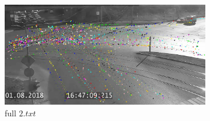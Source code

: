 \begin{figure}[!htb]
	\centering
	\begin{subfigure}[!htb]{0.68\textwidth}
		\centering{}
		\includegraphics[width=\textwidth]{images/regr_kp_full.png}
		\caption{full $2.txt$}
	\end{subfigure}
	\hfill
	\begin{subfigure}[!htb]{0.3\textwidth}
		\centering{}

\end{subfigure}
\end{figure}
